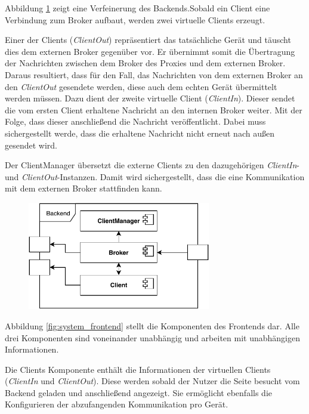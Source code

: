     Abbildung \ref{fig:system_backend} zeigt eine Verfeinerung des Backends.Sobald ein Client eine Verbindung zum Broker aufbaut, werden zwei virtuelle Clients erzeugt.
    
    Einer der Clients (\emph{ClientOut}) repräsentiert das tatsächliche Gerät und täuscht dies dem externen Broker gegenüber vor. Er übernimmt somit die Übertragung der Nachrichten zwischen dem Broker des Proxies und dem externen Broker. Daraus resultiert, dass für den Fall, das Nachrichten von dem externen Broker an den \emph{ClientOut} gesendete werden, diese auch dem echten Gerät übermittelt werden müssen. Dazu dient der zweite virtuelle Client (\emph{ClientIn}). Dieser sendet die vom ersten Client erhaltene Nachricht an den internen Broker weiter. Mit der Folge, dass dieser anschließend die Nachricht veröffentlicht. Dabei muss sichergestellt werde, dass die erhaltene Nachricht nicht erneut nach außen gesendet wird.
    
    Der ClientManager übersetzt die externe Clients zu den dazugehörigen \emph{ClientIn}- und \emph{ClientOut}-Instanzen. Damit wird sichergestellt, dass die eine Kommunikation mit dem externen Broker stattfinden kann.
    \begin{figure}[h]%
        \centering
        \includegraphics[width=8cm]{tex/bilder/4_konzept/Systemdiagramm_Konzept_Backend.pdf}
        \label{fig:system_backend}
    \end{figure}
    
    Abbildung \ref{fig:system_frontend} stellt die Komponenten des Frontends dar. Alle drei Komponenten sind voneinander unabhängig und arbeiten mit unabhängigen Informationen.
    
    Die Clients Komponente enthält die Informationen der virtuellen Clients (\emph{ClientIn} und \emph{ClientOut}). Diese werden sobald der Nutzer die Seite besucht vom Backend geladen und anschließend angezeigt. Sie ermöglicht ebenfalls die Konfigurieren der abzufangenden Kommunikation pro Gerät.
    

